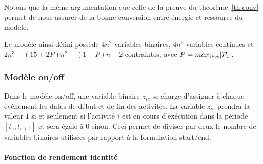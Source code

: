 Notons que la même argumentation que celle de la preuve du
théorème~\ref{th:conv} permet de nous assurer de la bonne conversion
entre énergie et ressource du modèle. 

Le modèle ainsi défini possède $4n^2$ variables binaires, $4n^2$
variables continues et $2n^3+ (15 + 2P)n^2+\left(1-P\right)n-2$
contraintes, avec $P=max_{i\in A}|\P_i|$.

\subsubsection{Modèle on/off}
\label{sssection:OO_CECSP}
Dans le modèle on/off, une variable binaire $z_{ie}$ se charge
d'assigner à chaque événement les dates de début et de fin des
activités. La variable $z_{ie}$ prendra la valeur $1$ si et seulement
si l'activité $i$ est en cours d'exécution dans la période
$[t_e,t_{e+1}]$ et sera égale à $0$ sinon. Ceci permet de diviser par
deux le nombre de variables binaires utilisées par rapport à la
formulation start/end.

\paragraph{Fonction de rendement identité}

